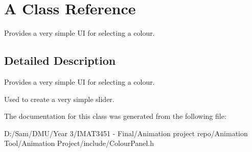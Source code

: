 \hypertarget{class_a}{}\section{A Class Reference}
\label{class_a}


Provides a very simple UI for selecting a colour.  




\subsection{Detailed Description}
Provides a very simple UI for selecting a colour. 

Used to create a very simple slider. 

The documentation for this class was generated from the following file\+:\begin{DoxyCompactItemize}
\item 
D\+:/\+Sam/\+D\+M\+U/\+Year 3/\+I\+M\+A\+T3451 -\/ Final/\+Animation project repo/\+Animation Tool/\+Animation Project/include/Colour\+Panel.\+h\end{DoxyCompactItemize}
